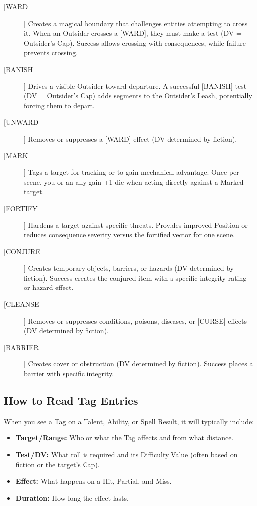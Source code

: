 \begin{description}
  \item[[WARD]]  Creates a magical boundary that challenges entities attempting to cross it. When an Outsider crosses a [WARD], they must make a test (DV = Outsider's Cap). Success allows crossing with consequences, while failure prevents crossing.
  \item[[BANISH]]  Drives a visible Outsider toward departure. A successful [BANISH] test (DV = Outsider's Cap) adds segments to the Outsider's Leash, potentially forcing them to depart.
  \item[[UNWARD]]  Removes or suppresses a [WARD] effect (DV determined by fiction).
  \item[[MARK]]  Tags a target for tracking or to gain mechanical advantage. Once per scene, you or an ally gain +1 die when acting directly against a Marked target.
  \item[[FORTIFY]]  Hardens a target against specific threats. Provides improved Position or reduces consequence severity versus the fortified vector for one scene.
  \item[[CONJURE]]  Creates temporary objects, barriers, or hazards (DV determined by fiction). Success creates the conjured item with a specific integrity rating or hazard effect.
  \item[[CLEANSE]]  Removes or suppresses conditions, poisons, diseases, or [CURSE] effects (DV determined by fiction).
  \item[[BARRIER]]  Creates cover or obstruction (DV determined by fiction). Success places a barrier with specific integrity.
\end{description}

\subsection*{How to Read Tag Entries}

When you see a Tag on a Talent, Ability, or Spell Result, it will typically include:
\begin{itemize}
  \item \textbf{Target/Range:} Who or what the Tag affects and from what distance.
  \item \textbf{Test/DV:} What roll is required and its Difficulty Value (often based on fiction or the target's Cap).
  \item \textbf{Effect:} What happens on a Hit, Partial, and Miss.
  \item \textbf{Duration:} How long the effect lasts.
\end{itemize}

